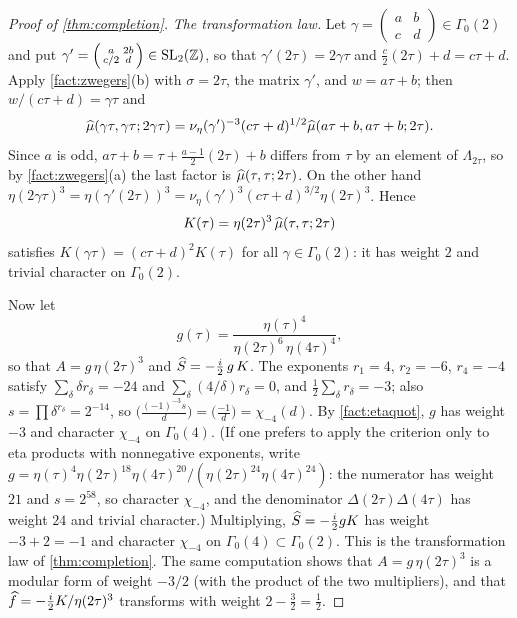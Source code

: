 \begin{proof}[Proof of \cref{thm:completion}]
\emph{The transformation law.} Let $\gamma=\left(\begin{smallmatrix}a&b\\c&d\end{smallmatrix}\right)\in\Gamma_0(2)$
and put $\gamma'=\left(\begin{smallmatrix}a&2b\\c/2&d\end{smallmatrix}\right)\in\mathrm{SL}_2(\mathbb{Z})$,
so that $\gamma'(2\tau)=2\gamma\tau$ and $\frac c2(2\tau)+d=c\tau+d$. Apply
\cref{fact:zwegers}(b) with $\sigma=2\tau$, the matrix $\gamma'$, and
$w=a\tau+b$; then $w/(c\tau+d)=\gamma\tau$ and
\[
\widehat{\mu}(\gamma\tau,\gamma\tau;2\gamma\tau)=\nu_\eta(\gamma')^{-3}(c\tau+d)^{1/2}
\widehat{\mu}(a\tau+b,a\tau+b;2\tau).
\]
Since $a$ is odd, $a\tau+b=\tau+\frac{a-1}{2}(2\tau)+b$ differs from $\tau$ by an
element of $\Lambda_{2\tau}$, so by \cref{fact:zwegers}(a) the last factor is
$\widehat{\mu}(\tau,\tau;2\tau)$. On the other hand
$\eta(2\gamma\tau)^3=\eta(\gamma'(2\tau))^3=\nu_\eta(\gamma')^3(c\tau+d)^{3/2}\eta(2\tau)^3$.
Hence
\[
K(\tau)=\eta(2\tau)^3\,\widehat{\mu}(\tau,\tau;2\tau)
\]
satisfies $K(\gamma\tau)=(c\tau+d)^2K(\tau)$ for all $\gamma\in\Gamma_0(2)$:
it has weight $2$ and trivial character on $\Gamma_0(2)$.

Now let
\[
g(\tau)=\frac{\eta(\tau)^4}{\eta(2\tau)^6\,\eta(4\tau)^4},
\]
so that $A=g\,\eta(2\tau)^3$ and $\widehat{S}=-\frac i2\,g\,K$. The exponents
$r_1=4$, $r_2=-6$, $r_4=-4$ satisfy $\sum_\delta\delta r_\delta=-24$ and
$\sum_\delta(4/\delta)r_\delta=0$, and $\frac12\sum_\delta r_\delta=-3$; also
$s=\prod\delta^{r_\delta}=2^{-14}$, so $\big(\frac{(-1)^{-3}s}{d}\big)=\big(\frac{-1}{d}\big)=\chi_{-4}(d)$.
By \cref{fact:etaquot}, $g$ has weight $-3$ and character $\chi_{-4}$ on
$\Gamma_0(4)$. (If one prefers to apply the criterion only to eta products with
nonnegative exponents, write $g=\eta(\tau)^4\eta(2\tau)^{18}\eta(4\tau)^{20}/(\eta(2\tau)^{24}\eta(4\tau)^{24})$:
the numerator has weight $21$ and $s=2^{58}$, so character $\chi_{-4}$, and the
denominator $\Delta(2\tau)\Delta(4\tau)$ has weight $24$ and trivial character.)
Multiplying, $\widehat{S}=-\frac i2gK$ has weight $-3+2=-1$ and character $\chi_{-4}$
on $\Gamma_0(4)\subset\Gamma_0(2)$. This is the transformation law of
\cref{thm:completion}. The same computation shows that $A=g\,\eta(2\tau)^3$ is
a modular form of weight $-3/2$ (with the product of the two multipliers), and
that $\widehat{f}=-\frac i2K/\eta(2\tau)^3$ transforms with weight $2-\frac32=\frac12$.


\end{proof}
